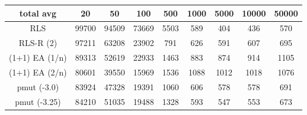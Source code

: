 \begin{tabular}[h]{ccccccccc}
total avg&20&50&100&500&1000&5000&10000&50000\\\hline
RLS&99700&94509&73669&5503&589&404&436&570\\
RLS-R (2)&97211&63208&23902&791&626&591&607&695\\
(1+1) EA (1/n)&89313&52619&22933&1463&883&874&914&1105\\
(1+1) EA (2/n)&80601&39550&15969&1536&1088&1012&1018&1076\\
pmut (-3.0)&83924&47328&19391&1060&606&578&578&691\\
pmut (-3.25)&84210&51035&19488&1328&593&547&553&673\\
\end{tabular}

